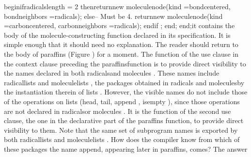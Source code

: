 \tyxtstxendbf[]
   \tyxtstxbf[]begin\tyxtstxendbf[]
      \tyxtstxbf[]if\tyxtstxendbf[] radicals\rsquo[]length = 2 %
\tyxtstxbf[]then\tyxtstxendbf[]
         \tyxtstxbf[]return\tyxtstxendbf[] \tyxtstxbf[]new%
\tyxtstxendbf[] molecule\Symuns[]node\rsquo[](kind =\Symgt[] bond\Symuns[]centered,
                                   bond\Symuns[]neighbors =\Symgt[] radicals);
      \tyxtstxbf[]else\tyxtstxendbf[] -- Must be 4.
         \tyxtstxbf[]return\tyxtstxendbf[] \tyxtstxbf[]new%
\tyxtstxendbf[] molecule\Symuns[]node\rsquo[](kind =\Symgt[] carbon\Symuns[]centered,
                                   carbon\Symuns[]neighbors =\Symgt[] radicals);
      \tyxtstxbf[]end\tyxtstxendbf[] \tyxtstxbf[]if%
\tyxtstxendbf[];
   \tyxtstxbf[]end\tyxtstxendbf[];
\tyxtstxbf[]end\tyxtstxendbf[];\Endcomp[]
\EndParbox[]
\FgEndblock[]
 it contains the body of the molecule-constructing function declared
in its specification. It is simple enough that it should need no explanation.%
\Endpara[]
\Para[]The reader should return to the body of \tyxffmxmono[]paraffins%
\tyxffmxendmono[] (Figure )
for a moment. The function of the use clause in the context clause
preceding the \tyxffmxmono[]paraffins\tyxffmxendmono[] function is
to provide direct visibility to the names declared in both %
\tyxffmxmono[]radicals\tyxffmxendmono[] and \tyxffmxmono[]molecules%
\tyxffmxendmono[]. These names include \tyxffmxmono[]radical\Symuns[]lists%
\tyxffmxendmono[] and \tyxffmxmono[]molecule\Symuns[]lists%
\tyxffmxendmono[], the packages obtained in \tyxffmxmono[]radicals%
\tyxffmxendmono[] and \tyxffmxmono[]molecules\tyxffmxendmono[] by
the instantiation therein of \tyxffmxmono[]lists%
\tyxffmxendmono[]. However, the visible names do not include those
of the operations on lists (\tyxffmxmono[]head\tyxffmxendmono[], %
\tyxffmxmono[]tail\tyxffmxendmono[], \tyxffmxmono[]append%
\tyxffmxendmono[], \tyxffmxmono[]is\Symuns[]empty%
\tyxffmxendmono[]), since those operations are not declared in %
\tyxffmxmono[]radicals\tyxffmxendmono[] or \tyxffmxmono[]molecules%
\tyxffmxendmono[]. It is the function of the second use clause, the
one in the declarative part of the \tyxffmxmono[]paraffins%
\tyxffmxendmono[] function, to provide direct visibility to them.
Note that the same set of subprogram
\TyPbrkNewp[]
 names is exported by both \tyxffmxmono[]radical\Symuns[]lists%
\tyxffmxendmono[] and \tyxffmxmono[]molecule\Symuns[]lists%
\tyxffmxendmono[]. How does the compiler know from which of these
packages the name \tyxffmxmono[]append\tyxffmxendmono[], appearing
later in \tyxffmxmono[]paraffins\tyxffmxendmono[], comes? The answer
